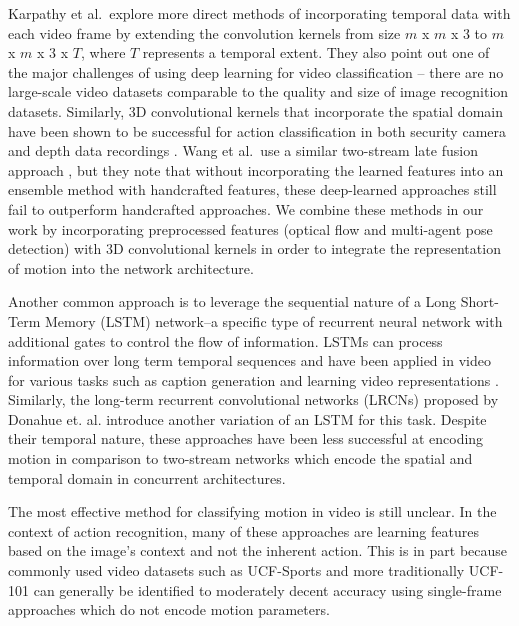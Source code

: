\documentclass[10pt,twocolumn,letterpaper]{article}
\begin{document}
Karpathy et al.~explore more direct methods of incorporating temporal data with each video frame by extending the convolution kernels from size $m$ x $m$ x $3$ to $m$ x $m$ x $3$ x $T$, where $T$ represents a temporal extent\cite{Karpathy_2014_CVPR}. They also point out one of the major challenges of using deep learning for video classification -- there are no large-scale video datasets comparable to the quality and size of image recognition datasets. Similarly, 3D convolutional kernels that incorporate the spatial domain have been shown to be successful for action classification in both security camera and depth data recordings \cite{6165309,Wang:2014:HAR:2647868.2654912}. Wang et al.~use a similar two-stream late fusion approach \cite{Wang_2015_CVPR}, but they note that without incorporating the learned features into an ensemble method with handcrafted features, these deep-learned approaches still fail to outperform handcrafted approaches. We combine these methods in our work by incorporating preprocessed features (optical flow and multi-agent pose detection) with 3D convolutional kernels in order to integrate the representation of motion into the network architecture.

Another common approach is to leverage the sequential nature of a Long Short-Term Memory (LSTM) network--a specific type of recurrent neural network with additional gates to control the flow of information. LSTMs can process information over long term temporal sequences and have been applied in video for various tasks such as caption generation \cite{venugopalan2015sequence} and learning video representations \cite{DBLP:journals/corr/SrivastavaMS15}. Similarly, the long-term recurrent convolutional networks (LRCNs) proposed by Donahue et. al. introduce another variation of an LSTM for this task. Despite their temporal nature, these approaches have been less successful at encoding motion in comparison to two-stream networks \cite{donahue2015long} which encode the spatial and temporal domain in concurrent architectures.

The most effective method for classifying motion in video is still unclear. In the context of action recognition, many of these approaches are learning features based on the image's context and not the inherent action. This is in part because commonly used video datasets such as UCF-Sports and more traditionally UCF-101 can generally be identified to moderately decent accuracy using single-frame approaches which do not encode motion parameters\cite{Karpathy_2014_CVPR}.
\end{document}
